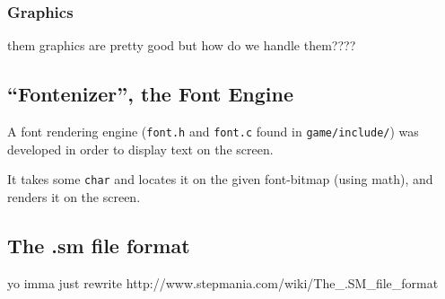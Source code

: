	\subsubsection{Graphics}
		them graphics are pretty good but how do we handle them????
\subsection{``Fontenizer'', the Font Engine}
	A font rendering engine (\texttt{font.h} and \texttt{font.c} found in \texttt{game/include/}) was developed in order to display text on the screen.

	It takes some \texttt{char} and locates it on the given font-bitmap (using math), and renders it on the screen.

	
\subsection{The .sm file format}
	yo imma just rewrite http://www.stepmania.com/wiki/The_.SM_file_format